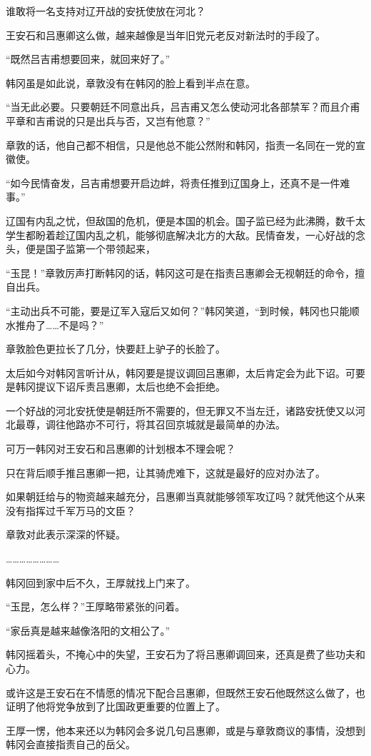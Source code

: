 谁敢将一名支持对辽开战的安抚使放在河北？

王安石和吕惠卿这么做，越来越像是当年旧党元老反对新法时的手段了。

“既然吕吉甫想要回来，就回来好了。”

韩冈虽是如此说，章敦没有在韩冈的脸上看到半点在意。

“当无此必要。只要朝廷不同意出兵，吕吉甫又怎么使动河北各部禁军？而且介甫平章和吉甫说的只是出兵与否，又岂有他意？”

章敦的话，他自己都不相信，只是他总不能公然附和韩冈，指责一名同在一党的宣徽使。

“如今民情奋发，吕吉甫想要开启边衅，将责任推到辽国身上，还真不是一件难事。”

辽国有内乱之忧，但敌国的危机，便是本国的机会。国子监已经为此沸腾，数千太学生都盼着趁辽国内乱之机，能够彻底解决北方的大敌。民情奋发，一心好战的念头，便是国子监第一个带领起来，

“玉昆！”章敦厉声打断韩冈的话，韩冈这可是在指责吕惠卿会无视朝廷的命令，擅自出兵。

“主动出兵不可能，要是辽军入寇后又如何？”韩冈笑道，“到时候，韩冈也只能顺水推舟了……不是吗？”

章敦脸色更拉长了几分，快要赶上驴子的长脸了。

太后如今对韩冈言听计从，韩冈要是提议调回吕惠卿，太后肯定会为此下诏。可要是韩冈提议下诏斥责吕惠卿，太后也绝不会拒绝。

一个好战的河北安抚使是朝廷所不需要的，但无罪又不当左迁，诸路安抚使又以河北最尊，调往他路亦不可行，将其召回京城就是最简单的办法。

可万一韩冈对王安石和吕惠卿的计划根本不理会呢？

只在背后顺手推吕惠卿一把，让其骑虎难下，这就是最好的应对办法了。

如果朝廷给与的物资越来越充分，吕惠卿当真就能够领军攻辽吗？就凭他这个从来没有指挥过千军万马的文臣？

章敦对此表示深深的怀疑。

……………………

韩冈回到家中后不久，王厚就找上门来了。

“玉昆，怎么样？”王厚略带紧张的问着。

“家岳真是越来越像洛阳的文相公了。”

韩冈摇着头，不掩心中的失望，王安石为了将吕惠卿调回来，还真是费了些功夫和心力。

或许这是王安石在不情愿的情况下配合吕惠卿，但既然王安石他既然这么做了，也证明了他将党争放到了比国政更重要的位置上了。

王厚一愣，他本来还以为韩冈会多说几句吕惠卿，或是与章敦商议的事情，没想到韩冈会直接指责自己的岳父。

